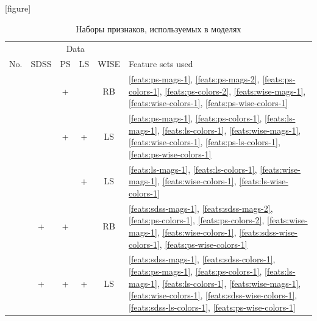 \documentclass[fleqn,usenatbib]{mnras}
\begin{document}
\begin{table}
    \caption{Наборы признаков, используемых в моделях}
    \label{tab:models}
    \centering
    [figure] 
    \renewcommand{\theModelNumber}{\arabic{ModelNumber}}
    \setcounter{ModelNumber}{0}
    \begin{tabular}{r c c c c l}
    \hline
        {}                      & \multicolumn{4}{c}{Data} & {}\\
        No. & SDSS & PS & LS & WISE & Feature sets used \\
    \hline
        {ModelNumber}\theModelNumber\label{model:pw} & & + & & RB & \ref{feats:ps-mags-1}, \ref{feats:ps-mags-2}, \ref{feats:ps-colors-1}, \ref{feats:ps-colors-2}, \ref{feats:wise-mags-1}, \ref{feats:wise-colors-1}, \ref{feats:ps-wise-colors-1} \\ %
        {ModelNumber}\theModelNumber\label{model:pdw} & & + & + & LS & \ref{feats:ps-mags-1}, \ref{feats:ps-colors-1}, \ref{feats:ls-mags-1}, \ref{feats:ls-colors-1}, \ref{feats:wise-mags-1}, \ref{feats:wise-colors-1}, \ref{feats:ps-ls-colors-1}, \ref{feats:ps-wise-colors-1} \\ %
        {ModelNumber}\theModelNumber\label{model:dw} & & & + & LS & \ref{feats:ls-mags-1}, \ref{feats:ls-colors-1}, \ref{feats:wise-mags-1}, \ref{feats:wise-colors-1}, \ref{feats:ls-wise-colors-1} \\ %
        {ModelNumber}\theModelNumber\label{model:spw} & + & + & & RB & \ref{feats:sdss-mags-1}, \ref{feats:sdss-mags-2}, \ref{feats:ps-colors-1}, \ref{feats:ps-colors-2}, \ref{feats:wise-mags-1}, \ref{feats:wise-colors-1}, \ref{feats:sdss-wise-colors-1}, \ref{feats:ps-wise-colors-1} \\
        {ModelNumber}\theModelNumber\label{model:spdw} & + & + & + & LS & \ref{feats:sdss-mags-1}, \ref{feats:sdss-colors-1}, \ref{feats:ps-mags-1}, \ref{feats:ps-colors-1}, \ref{feats:ls-mags-1}, \ref{feats:ls-colors-1}, \ref{feats:wise-mags-1}, \ref{feats:wise-colors-1}, \ref{feats:sdss-wise-colors-1}, \ref{feats:sdss-ls-colors-1}, \ref{feats:ps-wise-colors-1} \\ %
    \hline
    \end{tabular}
\end{table}
\end{document}
